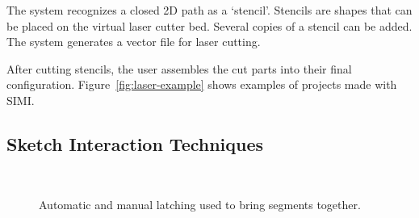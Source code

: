 \documentclass{article}
\begin{document}
The system recognizes a closed 2D path as a `stencil'. Stencils are
shapes that can be placed on the virtual laser cutter bed. Several
copies of a stencil can be added. The system generates a vector file
for laser cutting.

After cutting stencils, the user assembles the cut parts into their
final configuration. Figure~\ref{fig:laser-example} shows examples of
projects made with SIMI.

\subsection{Sketch Interaction Techniques}

\begin{figure}[h]
\centering {}\hspace{5mm}
\\
\hspace{5mm}
\caption{Automatic and manual latching used to bring segments together.}
\label{fig:latch}
\end{figure}
\end{document}
